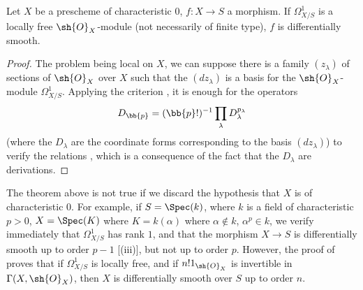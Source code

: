 \begin{theorem}[16.12.2]
\label{IV.16.12.2}
Let $X$ be a prescheme of characteristic $0$, $f:X \to S$ a morphism.
If $\Omega_{X/S}^1$ is a locally free $\sh{O}_X$-module (not necessarily of finite type), $f$ is differentially smooth.
\end{theorem}

\begin{proof}
The problem being local on $X$, we can suppose there is a family $(z_\lambda)$ of sections of $\sh{O}_X$ over $X$ such that the $(dz_\lambda)$ is a basis for the $\sh{O}_X$-module $\Omega_{X/S}^1$.
Applying the criterion , it is enough for the operators 
\[
  D_\bb{p} = (\bb{p}!)^{-1} \prod_\lambda D_\lambda^{p_\lambda}
\]
(where the $D_\lambda$ are the coordinate forms corresponding to the basis $(dz_\lambda)$) to verify the relations , which is a consequence of the fact that the $D_\lambda$ are derivations.
\end{proof}

\begin{env}[16.12.3]
\label{IV.16.12.3}
The theorem above is not true if we discard the hypothesis that $X$ is of characteristic $0$.
For example, if $S = \Spec(k)$, where $k$ is a field of characteristic $p > 0$, $X = \Spec(K)$ where $K = k(\alpha)$ where $\alpha \notin k$, $\alpha^p \in k$, we verify immediately 
that $\Omega_{X/S}^1$ has rank $1$, and that the morphism $X \to S$ is differentially smooth up to order $p - 1$ [(iii)], but not up to order $p$.
However, the proof of  proves that if $\Omega_{X/S}^1$ is locally free, and if $n! 1_{\sh{O}_X}$ is invertible in $\Gamma(X, \sh{O}_X)$, then $X$ is differentially smooth over $S$ up to order $n$.
\end{env}
